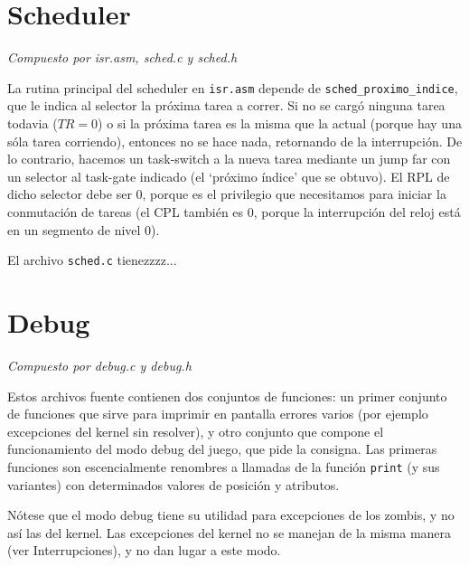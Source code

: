 \documentclass{article}
\begin{document}
	\section{Scheduler}
	\vspace{-1cm}
	\begin{flushright}
	\textit{Compuesto por isr.asm, sched.c y sched.h}
	\end{flushright}

	La rutina principal del scheduler en \texttt{isr.asm} depende de \texttt{sched\_proximo\_indice}, que le indica al selector la próxima tarea a correr. Si no se cargó ninguna tarea todavia ($TR = 0$) o si la próxima tarea es la misma que la actual (porque hay una sóla tarea corriendo), entonces no se hace nada, retornando de la interrupción. De lo contrario, hacemos un task-switch a la nueva tarea mediante un jump far con un selector al task-gate indicado (el `próximo índice' que se obtuvo). El RPL de dicho selector debe ser 0, porque es el privilegio que necesitamos para iniciar la conmutación de tareas (el CPL también es 0, porque la interrupción del reloj está en un segmento de nivel 0).

	El archivo \texttt{sched.c} tienezzzz...


	\section{Debug}
	\vspace{-1cm}
	\begin{flushright}
		\textit{Compuesto por debug.c y debug.h}
	\end{flushright}
	Estos archivos fuente contienen dos conjuntos de funciones: un primer conjunto de funciones que sirve para imprimir en pantalla errores varios (por ejemplo excepciones del kernel sin resolver), y otro conjunto que compone el funcionamiento del modo debug del juego, que pide la consigna. Las primeras funciones son escencialmente renombres a llamadas de la función \texttt{print} (y sus variantes) con determinados valores de posición y atributos.

	Nótese que el modo debug tiene su utilidad para excepciones de los zombis, y no así las del kernel. Las excepciones del kernel no se manejan de la misma manera (ver Interrupciones), y no dan lugar a este modo.
\end{document}
